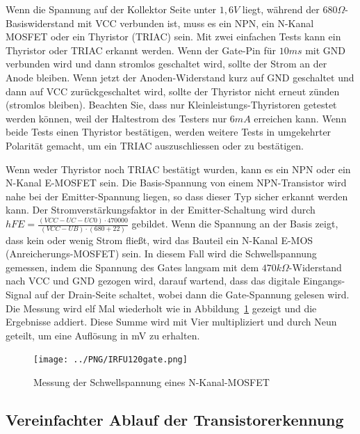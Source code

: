 Wenn die Spannung auf der Kollektor Seite unter \(1,6V\) liegt, während der \(680\Omega\)-Basiswiderstand mit
VCC verbunden ist, muss es ein NPN, ein N-Kanal MOSFET oder ein Thyristor (TRIAC) sein.
Mit zwei einfachen Tests kann ein Thyristor oder TRIAC erkannt werden.
Wenn der Gate-Pin für \(10ms\) mit GND verbunden wird und dann stromlos geschaltet wird, sollte
der Strom an der Anode bleiben.
Wenn jetzt der Anoden-Widerstand kurz auf GND geschaltet und dann auf VCC zurückgeschaltet wird,
sollte der Thyristor nicht erneut zünden (stromlos bleiben).
Beachten Sie, dass nur Kleinleistungs-Thyristoren getestet werden können, weil der Haltestrom des
Testers nur \(6mA\) erreichen kann.
Wenn beide Tests einen Thyristor bestätigen, werden weitere Tests in umgekehrter Polarität gemacht,
um ein TRIAC auszuschliessen oder zu bestätigen.

Wenn weder Thyristor noch TRIAC bestätigt wurden, kann es ein NPN oder ein N-Kanal E-MOSFET sein.
Die Basis-Spannung von einem NPN-Transistor wird nahe bei der Emitter-Spannung liegen, so dass dieser Typ sicher
erkannt werden kann.
Der Stromverstärkungsfaktor in der Emitter-Schaltung wird durch 
\(hFE = \frac{(VCC-UC-UC0)\cdot 470000}{(VCC-UB)\cdot (680+22)}\) gebildet.
Wenn die Spannung an der Basis zeigt, dass kein oder wenig Strom fließt, wird das Bauteil ein N-Kanal E-MOS
(Anreicherungs-MOSFET) sein.
In diesem Fall wird die Schwellspannung gemessen, indem die Spannung des Gates langsam mit
dem \(470k\Omega\)-Widerstand nach VCC und GND gezogen wird, darauf wartend, dass das digitale
Eingangs-Signal auf der Drain-Seite schaltet, wobei dann die Gate-Spannung gelesen wird.
Die Messung wird elf Mal wiederholt wie in Abbildung~\ref{fig:eleven} gezeigt und die Ergebnisse addiert.
Diese Summe wird mit Vier multipliziert und durch Neun geteilt, um eine Auflösung in mV zu erhalten.
\begin{figure}[H]
\centering
\texttt{[image: ../PNG/IRFU120gate.png]}
\caption{Messung der Schwellspannung eines N-Kanal-MOSFET}
\label{fig:eleven}
\end{figure}

\subsection{Vereinfachter Ablauf der Transistorerkennung}

